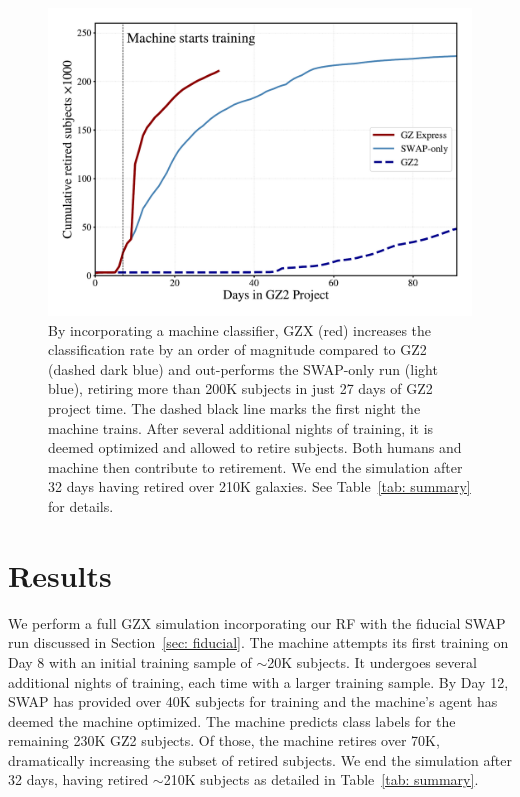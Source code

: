 \begin{figure}
\centering
\includegraphics[width=\textwidth]{Figures/human_machine/GZ2_sup_PLPD5_p5_flipfeature2b_moneyplot.pdf}
\caption[Performance of the human+machine combination -- Galaxy Zoo: Express]{By incorporating a machine classifier, GZX (red) increases the classification rate by an order of magnitude compared to GZ2 (dashed dark blue) and out-performs the SWAP-only run (light blue), retiring more than 200K subjects in just 27 days of GZ2 project time. The dashed black line marks the first night the machine trains. After several additional nights of training, it is deemed optimized and allowed to retire subjects. Both humans and machine then contribute to retirement. We end the simulation after 32 days having retired over 210K galaxies. See Table~\ref{tab: summary} for details. \label{fig: money}}
\end{figure}


\section{Results} \label{sec: results}
We perform a full GZX simulation incorporating our RF with the fiducial 
SWAP run discussed in Section~\ref{sec: fiducial}. The machine attempts its first training on Day 8 with an initial training sample of $\sim$20K subjects. It undergoes several additional nights of training, each time with a larger training sample. By Day 12, SWAP has provided over 40K subjects for training and the machine's agent has deemed the machine optimized. The machine predicts class labels for the remaining 230K GZ2 subjects. Of those, the machine retires over 70K, dramatically increasing the subset of retired subjects. We end the simulation after 32 days, having retired $\sim$210K subjects as detailed in Table~\ref{tab: summary}. 


